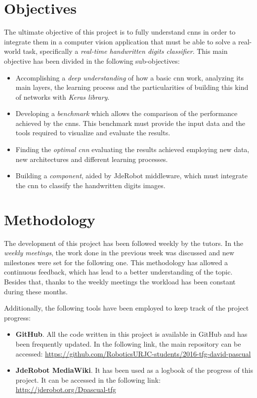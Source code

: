 \section{Objectives}\label{sec:objectives}
The ultimate objective of this project is to fully understand \glspl{cnn} in order to integrate them in a computer vision application that must be able to solve a real-world task, specifically a \emph{real-time handwritten digits classifier}. This main objective has been divided in the following sub-objectives: 
\begin{itemize}
	\item Accomplishing a \emph{deep understanding} of how a basic \gls{cnn} work, analyzing its main layers, the learning process and the particularities of building this kind of networks with \emph{Keras library}.
	\item Developing a \emph{benchmark} which allows the comparison of the performance achieved by the \glspl{cnn}. This benchmark must provide the input data and the tools required to visualize and evaluate the results.
	\item Finding the \emph{optimal \gls{cnn}} evaluating the results achieved employing new data, new architectures and different learning processes.
	\item Building a \emph{component}, aided by JdeRobot middleware, which must integrate the \gls{cnn} to classify the handwritten digits images.
\end{itemize}

\section{Methodology}
The development of this project has been followed weekly by the tutors. In the \emph{weekly meetings}, the work done in the previous week was discussed and new milestones were set for the following one. This methodology has allowed a continuous feedback, which has lead to a better understanding of the topic. Besides that, thanks to the weekly meetings the workload has been constant during these months. 

Additionally, the following tools have been employed to keep track of the project progress:
\begin{itemize}
	\item \textbf{GitHub}. All the code written in this project is available in GitHub and has been  frequently updated. In the following link, the main repository can be accessed:
	\url{https://github.com/RoboticsURJC-students/2016-tfg-david-pascual}
	\item \textbf{JdeRobot MediaWiki}. It has been used as a logbook of the progress of this project. It can be accessed in the following link:
	\url{http://jderobot.org/Dpascual-tfg}
\end{itemize}

